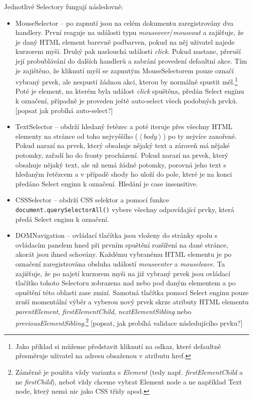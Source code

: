 \documentclass[thesis=B,czech]{FITthesis}[2012/06/26]
\begin{document}
Jednotlivé Selectory fungují následovně:
\begin{itemize}
	\item MouseSelector -- po zapnutí jsou na celém dokumentu zaregistrovány dva handlery. První reaguje na události typu \emph{mouseover}/\emph{mouseout} a zajišťuje, že je daný HTML element barevně podbarven, pokud na něj uživatel najede kurzorem myši. Druhý pak naslouchá události \emph{click}. Pokud nastane, přeruší její probublávání do dalších handlerů a zabrání provedení defaultní akce. Tím je zajištěno, že kliknutí myší se zapnutým MouseSelectorem pouze označí vybraný prvek, ale nespustí žádnou akci, kterou by normálně spustit měl.\footnote{Jako příklad si můžeme představit kliknutí na odkaz, které defaultně přesměruje uživatel na adresu obsaženou v atributu \textsf{href}.} Poté je element, na kterém byla událost \emph{click} spuštěna, předán Select enginu k označení, případně je proveden ještě auto-select všech podobných prvků. [popsat jak probíhá auto-select?]
	\item TextSelector -- obdrží hledaný řetězec a poté iteruje přes všechny HTML elementy na stránce od toho nejvyššího (\textsf{$\left<body\right>$}) po ty nejvíce zanořené. Pokud narazí na prvek, který obsahuje nějaký text a zároveň má nějaké potomky, zařadí ho do fronty procházení. Pokud narazí na prvek, který obsahuje nějaký text, ale už nemá žádné potomky, porovná jeho text s hledaným řetězcem a v případě shody ho uloží do pole, které je na konci předáno Select enginu k označení. Hledání je case insensitive.
	\item CSSSelector -- obdrží CSS selektor a pomocí funkce \verb|document.querySelectorAll()| vybere všechny odpovídající prvky, která předá Select enginu k označení.
	\item DOMNavigation -- ovládací tlačítka jsou vloženy do stránky spolu s ovládacím panelem hned při prvním spuštění rozšíření na dané stránce, akorát jsou ihned schovány. Každému vybranému HTML elementu je po označení zaregistrována obsluha událostí \emph{mouseenter} a \emph{mouseleave}. Ta zajišťuje, že po najetí kurzorem myši na již vybraný prvek jsou ovládací tlačítko tohoto Selectoru zobrazena nad nebo pod daným elementem a po opuštění této oblasti zase zmizí. Samotná tlačítka pomocí Select enginu pouze zruší momentální výběr a vyberou nový prvek skrze atributy HTML elementu \emph{parentElement}, \emph{firstElementChild}, \emph{nextElementSibling} nebo \emph{previousElementSibling}.\footnote{Záměrně je použita vždy varianta s \emph{Element} (tedy např. \emph{firstElementChild} a ne \emph{firstChild}), neboť vždy chceme vybrat Element node a ne například Text node, který nemá nic jako CSS třídy apod.} [popsat, jak probíhá validace následujícího prvku?]
\end{itemize}
\end{document}
